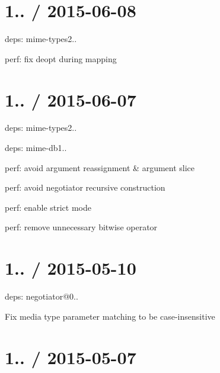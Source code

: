 \section*{1.. / 2015-\/06-\/08 }


\begin{DoxyItemize}
\item deps\+: mime-\/types2..
\begin{DoxyItemize}
\item perf\+: fix deopt during mapping
\end{DoxyItemize}
\end{DoxyItemize}

\section*{1.. / 2015-\/06-\/07 }


\begin{DoxyItemize}
\item deps\+: mime-\/types2..
\begin{DoxyItemize}
\item deps\+: mime-\/db1..
\end{DoxyItemize}
\item perf\+: avoid argument reassignment \& argument slice
\item perf\+: avoid negotiator recursive construction
\item perf\+: enable strict mode
\item perf\+: remove unnecessary bitwise operator
\end{DoxyItemize}

\section*{1.. / 2015-\/05-\/10 }


\begin{DoxyItemize}
\item deps\+: negotiator@0..
\begin{DoxyItemize}
\item Fix media type parameter matching to be case-\/insensitive
\end{DoxyItemize}
\end{DoxyItemize}

\section*{1.. / 2015-\/05-\/07 }


